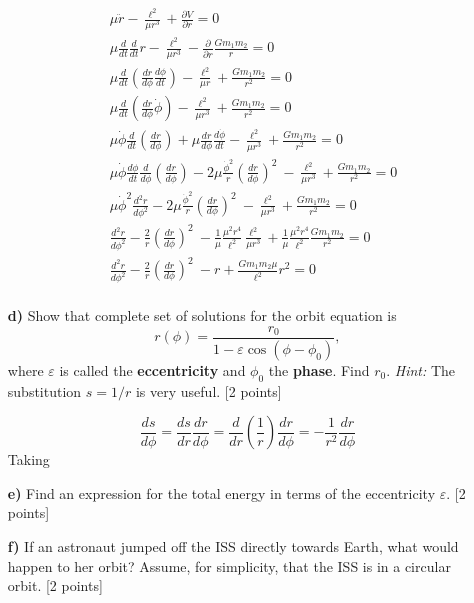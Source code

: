 \documentclass[11pt,a4paper]{report}
\newcounter{excount}[chapter]
\newenvironment{exercise}[1][]{\addtocounter{excount}{1} \noindent {\bf Question
    \arabic{excount} \ \ #1}\hspace{2mm}}{\vspace{4mm}}
\begin{document}
\begin{exercise}{\bf Orbital motion\\}
\begin{itemize}
\begin{align}
&\mu\ddot r-\frac{\ell^2}{\mu r^3}+\frac{\partial V}{\partial r}=0\\
&\mu \frac{d}{dt}\frac{d}{dt} r-\frac{\ell^2}{\mu r^3}-\frac{\partial }{\partial r}\frac{Gm_1m_2}{r} =0\\
&\mu \frac{d}{dt}\left(\frac{dr}{d\phi}\frac{d \phi}{dt}\right) -\frac{\ell^2}{\mu r}+\frac{Gm_1m_2}{r^2} =0\\
&\mu \frac{d}{dt}\left(\frac{dr}{d\phi}\dot{\phi} \right) -\frac{\ell^2}{\mu r^3}+\frac{Gm_1m_2}{r^2} =0\\
&\mu \dot{\phi}\frac{d}{dt}(\frac{dr}{d\phi}) + \mu \frac{dr}{d\phi} \frac{d \dot{\phi}}{dt} -\frac{\ell^2}{\mu r^3}+\frac{Gm_1m_2}{r^2} =0\\
&\mu \dot{\phi}\frac{d\phi}{dt} \frac{d}{d\phi}(\frac{dr}{d\phi}) -2 \mu \frac{\dot{\phi}^2}{r} \left(\frac{dr}{d\phi}\right)^2  \  -\frac{\ell^2}{\mu r^3}+\frac{Gm_1m_2}{r^2} =0\\
&\mu \dot{\phi}^2 \frac{d^2r}{d\phi^2} -2 \mu \frac{\dot{\phi}^2}{r} \left(\frac{dr}{d\phi}\right)^2  \  -\frac{\ell^2}{\mu r^3}+\frac{Gm_1m_2}{r^2} =0\\
&\frac{d^2r}{d\phi^2} - \frac{2}{r} \left(\frac{dr}{d\phi}\right)^2  \  - \frac{1}{\mu}\frac{\mu^2 r^4}{ \ell^2} \frac{\ell^2}{\mu r^3}+\frac{1}{\mu}\frac{\mu^2 r^4}{ \ell^2}\frac{Gm_1m_2}{r^2} =0\\
&\frac{d^2r}{d\phi^2} - \frac{2}{r} \left(\frac{dr}{d\phi}\right)^2  \  - r+\frac{Gm_1m_2 \mu}{\ell^2} r^2=0\\
\end{align}



\item[{\bf d)}] Show that complete set of solutions for the orbit equation  is
\begin{equation}
r(\phi)= \frac{r_0}{1-\varepsilon \cos(\phi-\phi_0)},
\end{equation}
where $\varepsilon$ is called the {\bf eccentricity} and $\phi_0$ the {\bf phase}. Find $r_0$.
{\it Hint:} The substitution $s=1/r$ is very useful. [2 points] \par 
\begin{equation}
\frac{ds}{d\phi}=\frac{ds}{dr}\frac{dr}{d\phi}=\frac{d}{dr}\left(\frac{1}{r}\right)\frac{dr}{d\phi}=-\frac{1}{r^2}\frac{dr}{d\phi}
\end{equation}
Taking



\item[{\bf e)}] Find an expression for the total energy in terms of the eccentricity $\varepsilon$. [2 points]
\item[{\bf f)}] If an astronaut jumped off the ISS directly towards Earth, what would happen to her orbit? Assume, for simplicity, that the ISS is in a circular orbit. [2 points]
\end{itemize}
\end{exercise}
\end{document}

